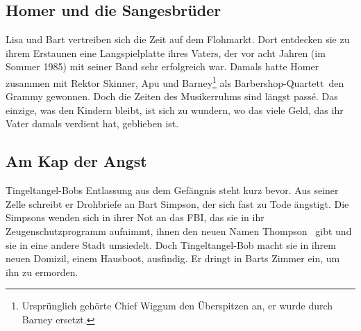 \subsection{Homer und die Sangesbrüder}\label{9F21}
Lisa und Bart vertreiben sich die Zeit auf dem Flohmarkt. Dort entdecken sie zu ihrem Erstaunen eine Langspielplatte ihres Vaters, der vor acht Jahren (im Sommer 1985) mit seiner Band sehr erfolgreich war. Damals hatte Homer zusammen mit Rektor Skinner, Apu und Barney\footnote{Ursprünglich gehörte Chief Wiggum den Überspitzen an, er wurde durch Barney ersetzt.} als \glqq Barbershop-Quartett\grqq\ den Grammy gewonnen. Doch die Zeiten des Musikerruhms sind längst passé. Das einzige, was den Kindern bleibt, ist sich zu wundern, wo das viele Geld, das ihr Vater damals verdient hat, geblieben ist.


	
\subsection{Am Kap der Angst}\label{9F22}
Tingeltangel-Bobs Entlassung aus dem Gefängnis steht kurz bevor. Aus seiner Zelle schreibt er Drohbriefe an Bart Simpson, der sich fast zu Tode ängstigt. Die Simpsons wenden sich in ihrer Not an das FBI, das sie in ihr Zeugenschutzprogramm aufnimmt, ihnen den neuen Namen \glqq Thompson\grqq\  gibt und sie in eine andere Stadt umsiedelt. Doch Tingeltangel-Bob macht sie in ihrem neuen Domizil, einem Hausboot, ausfindig. Er dringt in Barts Zimmer ein, um ihn zu ermorden.

